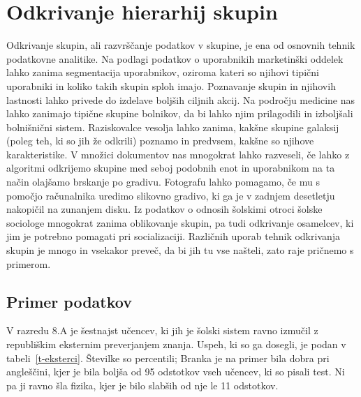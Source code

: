 \chapter{Odkrivanje hierarhij skupin}

Odkrivanje skupin, ali razvrščanje podatkov v skupine, je ena od
osnovnih tehnik podatkovne analitike. Na podlagi podatkov o
uporabnikih marketinški oddelek lahko zanima segmentacija uporabnikov,
oziroma kateri so njihovi tipični uporabniki in koliko takih skupin
sploh imajo. Poznavanje skupin in njihovih lastnosti lahko privede do
izdelave boljših ciljnih akcij. Na področju medicine nas lahko
zanimajo tipične skupine bolnikov, da bi lahko njim prilagodili in
izboljšali bolnišnični sistem. Raziskovalce vesolja lahko zanima,
kakšne skupine galaksij (poleg teh, ki so jih že odkrili) poznamo in
predvsem, kakšne so njihove karakteristike. V množici dokumentov nas
mnogokrat lahko razveseli, če lahko z algoritmi odkrijemo skupine med
seboj podobnih enot in uporabnikom na ta način olajšamo brskanje po
gradivu. Fotografu lahko pomagamo, če mu s pomočjo računalnika
uredimo slikovno gradivo, ki ga je v zadnjem desetletju nakopičil na
zunanjem disku. Iz podatkov o odnosih šolskimi otroci šolske sociologe
mnogokrat zanima oblikovanje skupin, pa tudi odkrivanje osamelcev, ki
jim je potrebno pomagati pri socializaciji. Različnih uporab tehnik
odkrivanja skupin je mnogo in vsekakor preveč, da bi jih tu vse
našteli, zato raje pričnemo s primerom.

\section{Primer podatkov}

V razredu 8.A je šestnajst učencev, ki jih je šolski sistem ravno
izmučil z republiškim eksternim preverjanjem znanja. Uspeh, ki so ga
dosegli, je podan v tabeli~\ref{t-eksterci}. Številke so percentili;
Branka je na primer bila dobra pri angleščini, kjer je bila boljša od
95 odstotkov vseh učencev, ki so pisali test. Ni pa ji ravno šla
fizika, kjer je bilo slabših od nje le 11 odstotkov.


